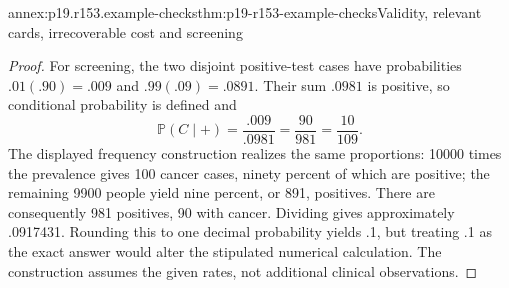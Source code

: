 \begin{annexitem}{annex:p19.r153.example-checks}{thm:p19-r153-example-checks}{Validity, relevant cards, irrecoverable cost and screening}
\begin{proof}
For screening, the two disjoint positive-test cases have probabilities
\(.01(.90)=.009\) and \(.99(.09)=.0891\). Their sum
\(.0981\) is positive, so conditional probability is defined and
\[
 \mathbb P(C\mid +)=\frac{.009}{.0981}
   =\frac{90}{981}=\frac{10}{109}.
\]
The displayed frequency construction realizes the same proportions:
10000 times the prevalence gives 100 cancer cases, ninety percent
of which are positive; the remaining 9900 people yield nine percent,
or 891, positives. There are consequently 981 positives, 90 with
cancer. Dividing gives approximately .0917431. Rounding this to one
decimal probability yields .1, but treating .1 as the exact answer
would alter the stipulated numerical calculation. The construction
assumes the given rates, not additional clinical observations.
\end{proof}
\end{annexitem}
